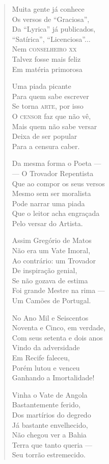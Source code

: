 \begin{verse}
Muita gente já conhece \\
Os versos de ``Graciosa'', \\
Da ``Lyrica'' já publicados, \\
``Satírica'', ``Licenciosa''... \\
Nem \textsc{conselheiro xx} \\
Talvez fosse mais feliz \\
Em matéria primorosa 


Uma piada picante \\
Para quem sabe escrever \\
Se torna \textsc{arte}, por isso \\
O \textsc{censor} faz que não vê, \\
Mais quem não sabe versar \\
Deixa de ser popular \\
Para a censura caber. 

Da mesma forma o Poeta ---\\
--- O Trovador Repentista \\
Que ao compor os seus versos \\
Mesmo sem ser moralista \\
Pode narrar uma piada \\
Que o leitor acha engraçada \\
Pelo versar do Artista. 

Assim Gregório de Matos \\
Não era um Vate Imoral, \\
Ao contrário: um Trovador \\
De inspiração genial, \\
Se não gozava de estima \\
Foi grande Mestre na rima ---\\
Um Camões de Portugal. 

No Ano Mil e Seiscentos \\
Noventa e Cinco, em verdade, \\
Com seus setenta e dois anos \\
Vindo da adversidade \\
Em Recife faleceu, \\
Porém lutou e venceu \\
Ganhando a Imortalidade! 


Vinha o Vate de Angola \\
Bastantemente ferido, \\
Dos martírios do degredo \\
Já bastante envelhecido, \\
Não chegou ver a Bahia \\
Terra que tanto queria ---\\
Seu torrão estremecido. 


\end{verse}
